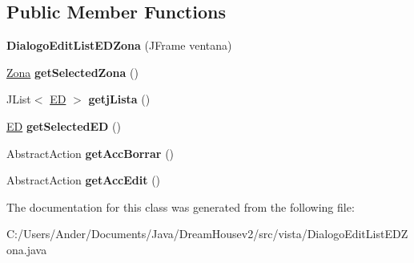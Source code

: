 \subsection*{Public Member Functions}
\begin{DoxyCompactItemize}
\item 
\mbox{\label{classvista_1_1_dialogo_edit_list_e_d_zona_a273305aa9830fb4708b0e5e61ce23d7b}} 
{\bfseries Dialogo\+Edit\+List\+E\+D\+Zona} (J\+Frame ventana)
\item 
\mbox{\label{classvista_1_1_dialogo_edit_list_e_d_zona_a46296f052e9839a3a8c3a8afa7e35fb1}} 
\mbox{\hyperlink{classmodelo_1_1_zona}{Zona}} {\bfseries get\+Selected\+Zona} ()
\item 
\mbox{\label{classvista_1_1_dialogo_edit_list_e_d_zona_a04493b294406aacc92c5ee9e8fee9351}} 
J\+List$<$ \mbox{\hyperlink{classmodelo_1_1_e_d}{ED}} $>$ {\bfseries getj\+Lista} ()
\item 
\mbox{\label{classvista_1_1_dialogo_edit_list_e_d_zona_a9ce7cbbde3889d56943a129bec80b538}} 
\mbox{\hyperlink{classmodelo_1_1_e_d}{ED}} {\bfseries get\+Selected\+ED} ()
\item 
\mbox{\label{classvista_1_1_dialogo_edit_list_e_d_zona_abd21175b4de94d23382219f555e5f6a4}} 
Abstract\+Action {\bfseries get\+Acc\+Borrar} ()
\item 
\mbox{\label{classvista_1_1_dialogo_edit_list_e_d_zona_a50a415351186eb3e9ad68a981f53bd61}} 
Abstract\+Action {\bfseries get\+Acc\+Edit} ()
\end{DoxyCompactItemize}


The documentation for this class was generated from the following file\+:\begin{DoxyCompactItemize}
\item 
C\+:/\+Users/\+Ander/\+Documents/\+Java/\+Dream\+Housev2/src/vista/Dialogo\+Edit\+List\+E\+D\+Zona.\+java\end{DoxyCompactItemize}
